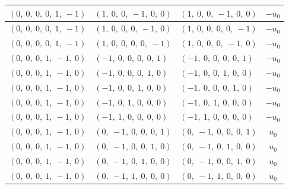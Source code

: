 \documentclass[11pt]{article}
\theoremstyle{definition}
\begin{document}
\begin{longtable}{|l|l|l|c|}
    \hline
    $\left( 0, \  0, \  0, \  0, \  1, \  -1\right)$ & $\left( 1, \  0, \  0, \  -1, \  0, \  0\right)$ & $\left( 1, \  0, \  0, \  -1, \  0, \  0\right)$ & $- u_{0}$ \\
    \hline
    $\left( 0, \  0, \  0, \  0, \  1, \  -1\right)$ & $\left( 1, \  0, \  0, \  0, \  -1, \  0\right)$ & $\left( 1, \  0, \  0, \  0, \  0, \  -1\right)$ & $- u_{0}$ \\
    \hline
    $\left( 0, \  0, \  0, \  0, \  1, \  -1\right)$ & $\left( 1, \  0, \  0, \  0, \  0, \  -1\right)$ & $\left( 1, \  0, \  0, \  0, \  -1, \  0\right)$ & $- u_{0}$ \\
    \hline
    $\left( 0, \  0, \  0, \  1, \  -1, \  0\right)$ & $\left( -1, \  0, \  0, \  0, \  0, \  1\right)$ & $\left( -1, \  0, \  0, \  0, \  0, \  1\right)$ & $- u_{0}$ \\
    \hline
    $\left( 0, \  0, \  0, \  1, \  -1, \  0\right)$ & $\left( -1, \  0, \  0, \  0, \  1, \  0\right)$ & $\left( -1, \  0, \  0, \  1, \  0, \  0\right)$ & $- u_{0}$ \\
    \hline
    $\left( 0, \  0, \  0, \  1, \  -1, \  0\right)$ & $\left( -1, \  0, \  0, \  1, \  0, \  0\right)$ & $\left( -1, \  0, \  0, \  0, \  1, \  0\right)$ & $- u_{0}$ \\
    \hline
    $\left( 0, \  0, \  0, \  1, \  -1, \  0\right)$ & $\left( -1, \  0, \  1, \  0, \  0, \  0\right)$ & $\left( -1, \  0, \  1, \  0, \  0, \  0\right)$ & $- u_{0}$ \\
    \hline
    $\left( 0, \  0, \  0, \  1, \  -1, \  0\right)$ & $\left( -1, \  1, \  0, \  0, \  0, \  0\right)$ & $\left( -1, \  1, \  0, \  0, \  0, \  0\right)$ & $- u_{0}$ \\
    \hline
    $\left( 0, \  0, \  0, \  1, \  -1, \  0\right)$ & $\left( 0, \  -1, \  0, \  0, \  0, \  1\right)$ & $\left( 0, \  -1, \  0, \  0, \  0, \  1\right)$ & $u_{0}$ \\
    \hline
    $\left( 0, \  0, \  0, \  1, \  -1, \  0\right)$ & $\left( 0, \  -1, \  0, \  0, \  1, \  0\right)$ & $\left( 0, \  -1, \  0, \  1, \  0, \  0\right)$ & $u_{0}$ \\
    \hline
    $\left( 0, \  0, \  0, \  1, \  -1, \  0\right)$ & $\left( 0, \  -1, \  0, \  1, \  0, \  0\right)$ & $\left( 0, \  -1, \  0, \  0, \  1, \  0\right)$ & $u_{0}$ \\
    \hline
    $\left( 0, \  0, \  0, \  1, \  -1, \  0\right)$ & $\left( 0, \  -1, \  1, \  0, \  0, \  0\right)$ & $\left( 0, \  -1, \  1, \  0, \  0, \  0\right)$ & $u_{0}$ \\

\end{longtable}
\end{document}
